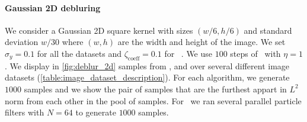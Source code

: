 \paragraph*{Gaussian 2D debluring}
We consider a Gaussian 2D square kernel with sizes $(w / 6, h / 6)$ and standard deviation $w / 30$ where $(w, h)$ are the width and height of the image.
We set $\sigma_y = 0.1$ for all the datasets
and $\zeta_{\mathrm{coeff}} = 0.1$ for \dps\ . We use $100$ steps of \ddim\ with $\eta=1$.
We display in \cref{fig:deblur_2d} samples from \algo, \dps and \ddrm over several different image datasets (\cref{table:image_dataset_description}).
For each algorithm, we
generate $1000$ samples and we show the pair of samples that are the furthest appart in $L^2$ norm from each other in the pool of samples.
For \algo\ we ran several parallel particle filters with $N=64$ to generate $1000$ samples.
